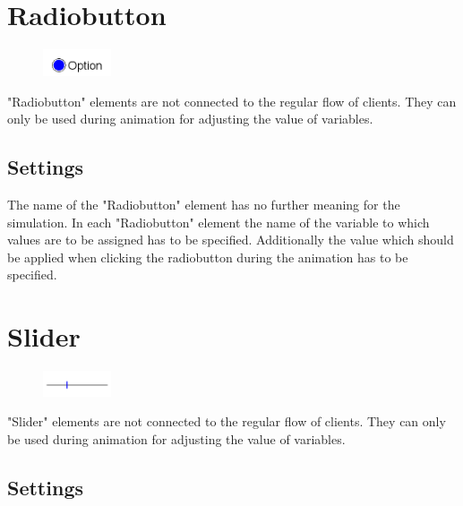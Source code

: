 \section{Radiobutton}
\label{ref:ModelElementInteractiveRadiobutton}

\begin{figure}
\vspace{-22pt}
\includegraphics[width=2cm]{imageModelElementInteractiveRadiobutton.png}
\vspace{-22pt}
\end{figure}

"Radiobutton" elements are not connected to the regular flow of clients.
They can only be used during animation for adjusting the value of
variables.

\subsection*{Settings}

The name of the "Radiobutton" element has no further meaning for the simulation.
In each "Radiobutton" element the name of the variable to which values are to
be assigned has to be specified. Additionally the value which should be
applied when clicking the radiobutton during the animation has to be specified.  


\section{Slider}
\label{ref:ModelElementInteractiveSlider}

\begin{figure}
\vspace{-22pt}
\includegraphics[width=2cm]{imageModelElementInteractiveSlider.png}
\vspace{-22pt}
\end{figure}

"Slider" elements are not connected to the regular flow of clients.
They can only be used during animation for adjusting the value of
variables.

\subsection*{Settings}

